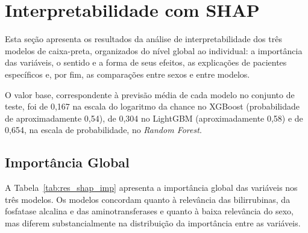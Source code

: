 \section{Interpretabilidade com SHAP}
\label{sec:res_shap}

Esta seção apresenta os resultados da análise de interpretabilidade dos três modelos de caixa-preta, organizados do nível global ao individual: a importância das variáveis, o sentido e a forma de seus efeitos, as explicações de pacientes específicos e, por fim, as comparações entre sexos e entre modelos.

O valor base, correspondente à previsão média de cada modelo no conjunto de teste, foi de 0,167 na escala do logaritmo da chance no XGBoost (probabilidade de aproximadamente 0,54), de 0,304 no LightGBM (aproximadamente 0,58) e de 0,654, na escala de probabilidade, no \textit{Random Forest}.

\subsection{Importância Global}
\label{sec:res_shap_global}

A Tabela~\ref{tab:res_shap_imp} apresenta a importância global das variáveis nos três modelos. Os modelos concordam quanto à relevância das bilirrubinas, da fosfatase alcalina e das aminotransferases e quanto à baixa relevância do sexo, mas diferem substancialmente na distribuição da importância entre as variáveis.

